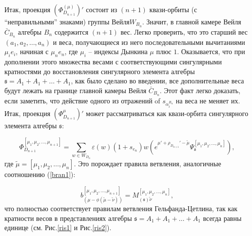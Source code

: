 \documentclass[12pt]{article}
\newcommand{\sfr}{\mathfrak{s}}
\begin{document}
Итак, проекция $(\Phi^{(\mu)}_{D_{n+1}})'$ состоит из  $(n+1)$ квази-орбиты (с  ``неправильными''
знаками) группы Вейля$W_{B_{n}}$. Значит, в главной камере Вейля  $\bar C_{B_n}$ алгебры
$B_n$ содержится
$(n+1)$ вес.  Легко проверить, что это старший вес  $(a_1,a_2,\dots,a_{n})$ и веса, получающиеся из
него последовательными вычитаниями $\mu_i e_i$, начиная с $\mu_n e_n$, где  $\mu_i$ -- индексы
Дынкина  $\mu$ плюс $1$. Оказывается, что при дополнении этого множества  весами с
соответствующими сингулярными кратностями до восстановления сингулярного элемента алгебры
$\sfr=A_1+A_1+\dots+A_1$, как было сделано во введении, все дополнительные веса будут лежать на
границе главной камеры Вейля $\bar C_{B_n}$. Этот факт легко доказать, если заметить, что действие
одного из отражений of $s_{\alpha_i^{B_n}}$ на веса не меняет их. Итак, проекция
$(\Phi^{\mu}_{D_{n+1}})'$ может рассматриваться как квази-орбита сингулярного элемента алгебры $\sfr$:

\begin{equation}
\Phi^{[\mu_1,\mu_2,\dots,\mu_{n+1}]}_{D_{n+1}}=\sum_{w\in W_{D_n}} \varepsilon(w) (1+s_{e_n})w (e^{\mu'+\rho_{D_{n+1}}'-\tilde\mu}\Psi^{[\mu_1,\mu_2,\dots,\mu_{n}]}_{\sfr}),
\end{equation}
где $\tilde\mu=[\mu_1,\mu_2,\dots,\mu_{n}]$. Это порождает  правила ветвления, аналогичные соотношению (\ref{bran1}):

\begin{equation}
b_{\left( \mu -\phi \left( \widetilde{\mu }-\widetilde{\nu }\right) \right)
}^{[\mu_1,\mu_2,\dots,\mu_{n+1}]}=M_{\left( \sfr\right) \widetilde{\nu }}^{[\mu_1,\mu_2,\dots,\mu_{n}]}, 
\label{bran11}
\end{equation}
что полностью соответствует правилам ветвления Гельфанда-Цетлина, так как кратности весов в
представлениях алгебры $\sfr=A_1+A_1+\dots+A_1$ всегда равны единице (см. Рис.\ref{ris1} и Рис.\ref{ris2}).
\end{document}
